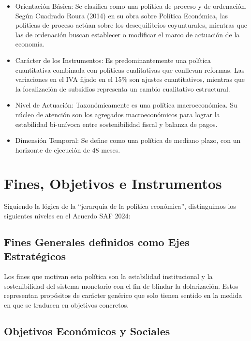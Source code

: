 \documentclass[12pt,spanish]{article}
\providecommand{\tightlist}{%
  \setlength{\itemsep}{0pt}\setlength{\parskip}{0pt}}
\begin{document}
\begin{itemize}
\tightlist
\item
  Orientación Básica: Se clasifica como una política de proceso y de
  ordenación. Según Cuadrado Roura (2014) en su obra sobre Política
  Económica, las políticas de proceso actúan sobre los desequilibrios
  coyunturales, mientras que las de ordenación buscan establecer o
  modificar el marco de actuación de la economía.
\item
  Carácter de los Instrumentos: Es predominantemente una política
  cuantitativa combinada con políticas cualitativas que conllevan
  reformas. Las variaciones en el IVA fijado en el 15\% son ajustes
  cuantitativos, mientras que la focalización de subsidios representa un
  cambio cualitativo estructural.
\item
  Nivel de Actuación: Taxonómicamente es una política macroeconómica. Su
  núcleo de atención son los agregados macroeconómicos para lograr la
  estabilidad bi-unívoca entre sostenibilidad fiscal y balanza de pagos.
\item
  Dimensión Temporal: Se define como una política de mediano plazo, con
  un horizonte de ejecución de 48 meses.
\end{itemize}

\section{Fines, Objetivos e
Instrumentos}\label{fines-objetivos-e-instrumentos}

Siguiendo la lógica de la ``jerarquía de la política económica'',
distinguimos los siguientes niveles en el Acuerdo SAF 2024:

\subsection{Fines Generales definidos como Ejes
Estratégicos}\label{fines-generales-definidos-como-ejes-estratuxe9gicos}

Los fines que motivan esta política son la estabilidad institucional y
la sostenibilidad del sistema monetario con el fin de blindar la
dolarización. Estos representan propósitos de carácter genérico que solo
tienen sentido en la medida en que se traducen en objetivos concretos.

\subsection{Objetivos Económicos y
Sociales}\label{objetivos-econuxf3micos-y-sociales}
\end{document}

